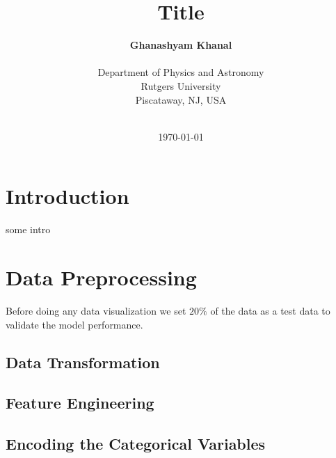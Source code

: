\documentclass[12pt]{article}
\begin{document}
\title{\textbf{Title}}
\author{\textbf{Ghanashyam Khanal}\\ \\  Department of Physics and Astronomy \\ Rutgers University \\ Piscataway, NJ, USA \\ \\ }
\date{\today}
\maketitle


\tableofcontents

\newpage

\section{Introduction}

some intro

\section{Data Preprocessing}

Before doing any data visualization we set $20\%$ of the data as a test data to validate the model performance.


\subsection{Data Transformation}



\subsection{Feature Engineering}





\subsection{Encoding the Categorical Variables}
\end{document}
